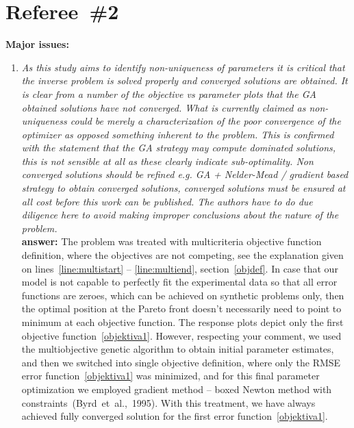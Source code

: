 \documentclass[final,3p, 11pt, a4paper]{elsarticle}
\begin{document}
\section*{Referee~\#2}

{\bf Major issues:}

\begin{enumerate}[label={\bf \Roman*}]
\item {\it As this study aims to identify non-uniqueness of parameters it is critical that the inverse problem is solved properly and converged solutions are obtained. It is clear from a number of the objective vs parameter plots that the GA obtained solutions have not converged. What is currently claimed as non-uniqueness could be merely a characterization of the poor convergence of the optimizer as opposed something inherent to the problem. This is confirmed with the statement that the GA strategy may compute dominated solutions, this is not sensible at all as these clearly indicate sub-optimality. Non converged solutions should be refined e.g. GA + Nelder-Mead / gradient based strategy to obtain converged solutions, converged solutions must be ensured at all cost before this work can be published. The authors have to do due diligence here
 to avoid making improper conclusions about the nature of the problem.} \\
{\bf answer:} The problem was treated with multicriteria objective function definition, where the objectives are not competing, see the explanation given on lines~\ref{line:multistart} -- \ref{line:multiend}, section~\ref{objdef}. In case that our model is not capable to perfectly fit the experimental data so that all error functions are zeroes, which can be achieved on synthetic problems only, then the optimal position at the Pareto front doesn't necessarily need to point to minimum at each  objective function. The response plots depict only the first objective function~\eqref{objektiva1}. However, respecting your comment, we used the multiobjective  genetic algorithm to obtain initial parameter estimates, and then we switched into single objective definition, where only the RMSE error function~\eqref{objektiva1} was minimized, and for this final parameter optimization we employed gradient method -- boxed Newton method with constraints~(Byrd~et~al.,~1995). With this treatment, we have always achieved fully converged solution for the first error function~\eqref{objektiva1}.


\end{enumerate}
\end{document}
